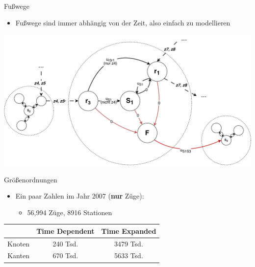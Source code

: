 \begin{frame}{Fußwege}
	\begin{itemize}
		\item Fußwege sind immer abhängig von der Zeit, also einfach zu modellieren
	\end{itemize}

	\begin{center}
		\includegraphics[width=.90\linewidth]{images/time-dependent/model_3.pdf}
	\end{center}
\end{frame}


\begin{frame}{Größenordnungen}
	\begin{itemize}
		\item Ein paar Zahlen im Jahr 2007 (\textbf{nur} Züge):
		\begin{itemize}
			\item 56,994 Züge, 8916 Stationen
		\end{itemize}
	\end{itemize}
	
	\begin{center}
		\begin{tabular}{ c||c|c } 
			& Time Dependent & Time Expanded \\
 			\hline
 			\hline
 			Knoten & 240 Tsd. & 3479 Tsd. \\
 			Kanten & 670 Tsd. & 5633 Tsd. \\
 			\hline
		\end{tabular}
	\end{center}
\end{frame}
















